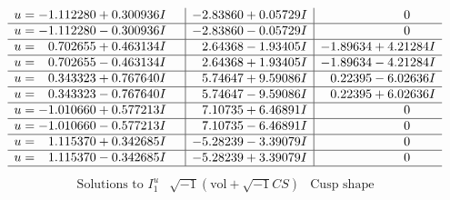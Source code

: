 \documentclass[1p]{elsarticle_modified}
\theoremstyle{definition}
\newcommand{\I}{\sqrt{-1}}
\begin{document}
$$\begin{array}{c|c|c}
\begin{aligned}
u &= -1.112280 + 0.300936 I\end{aligned}
 & -2.83860 + 0.05729 I & \phantom{-0.000000 } 0 \\ \hline\begin{aligned}
u &= -1.112280 - 0.300936 I\end{aligned}
 & -2.83860 - 0.05729 I & \phantom{-0.000000 } 0 \\ \hline\begin{aligned}
u &= \phantom{-}0.702655 + 0.463134 I\end{aligned}
 & \phantom{-}2.64368 - 1.93405 I & -1.89634 + 4.21284 I \\ \hline\begin{aligned}
u &= \phantom{-}0.702655 - 0.463134 I\end{aligned}
 & \phantom{-}2.64368 + 1.93405 I & -1.89634 - 4.21284 I \\ \hline\begin{aligned}
u &= \phantom{-}0.343323 + 0.767640 I\end{aligned}
 & \phantom{-}5.74647 + 9.59086 I & \phantom{-}0.22395 - 6.02636 I \\ \hline\begin{aligned}
u &= \phantom{-}0.343323 - 0.767640 I\end{aligned}
 & \phantom{-}5.74647 - 9.59086 I & \phantom{-}0.22395 + 6.02636 I \\ \hline\begin{aligned}
u &= -1.010660 + 0.577213 I\end{aligned}
 & \phantom{-}7.10735 + 6.46891 I & \phantom{-0.000000 } 0 \\ \hline\begin{aligned}
u &= -1.010660 - 0.577213 I\end{aligned}
 & \phantom{-}7.10735 - 6.46891 I & \phantom{-0.000000 } 0 \\ \hline\begin{aligned}
u &= \phantom{-}1.115370 + 0.342685 I\end{aligned}
 & -5.28239 - 3.39079 I & \phantom{-0.000000 } 0 \\ \hline\begin{aligned}
u &= \phantom{-}1.115370 - 0.342685 I\end{aligned}
 & -5.28239 + 3.39079 I & \phantom{-0.000000 } 0\\
 \hline 
 \end{array}$$\newpage$$\begin{array}{c|c|c}  
\text{Solutions to }I^u_{1}& \I (\text{vol} + \sqrt{-1}CS) & \text{Cusp shape}\\

\end{array}$$
\end{document}
